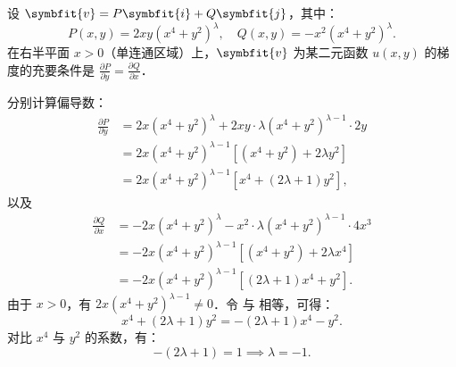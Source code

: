 \begin{solution}
    设 $\symbfit{v} = P \symbfit{i} + Q \symbfit{j}$，其中：
    \begin{equation}
        P(x,y) = 2xy(x^4 + y^2)^\lambda, \quad Q(x,y) = -x^2(x^4 + y^2)^\lambda.
    \end{equation}
    在右半平面 $x > 0$（单连通区域）上，$\symbfit{v}$ 为某二元函数 $u(x,y)$ 的梯度的充要条件是 $\frac{\partial P}{\partial y} = \frac{\partial Q}{\partial x}$．

    分别计算偏导数：
    \begin{equation}
        \label{eq:deriv-P}
        \begin{aligned}
            \frac{\partial P}{\partial y} & = 2x(x^4 + y^2)^\lambda + 2xy \cdot \lambda(x^4 + y^2)^{\lambda - 1} \cdot 2y \\
                                          & = 2x(x^4 + y^2)^{\lambda - 1} \left[ (x^4 + y^2) + 2\lambda y^2 \right]       \\
                                          & = 2x(x^4 + y^2)^{\lambda - 1} \left[ x^4 + (2\lambda + 1) y^2 \right],
        \end{aligned}
    \end{equation}
    以及
    \begin{equation}
        \label{eq:deriv-Q}
        \begin{aligned}
            \frac{\partial Q}{\partial x} & = -2x(x^4 + y^2)^\lambda - x^2 \cdot \lambda(x^4 + y^2)^{\lambda - 1} \cdot 4x^3 \\
                                          & = -2x(x^4 + y^2)^{\lambda - 1} \left[ (x^4 + y^2) + 2\lambda x^4 \right]         \\
                                          & = -2x(x^4 + y^2)^{\lambda - 1} \left[ (2\lambda + 1) x^4 + y^2 \right].
        \end{aligned}
    \end{equation}
    由于 $x > 0$，有 $2x(x^4 + y^2)^{\lambda - 1} \neq 0$．令  与  相等，可得：
    \begin{equation}
        x^4 + (2\lambda + 1) y^2 = -(2\lambda + 1) x^4 - y^2.
    \end{equation}
    对比 $x^4$ 与 $y^2$ 的系数，有：
    \begin{equation}
        -(2\lambda + 1) = 1 \implies \lambda = -1.
    \end{equation}


\end{solution}
